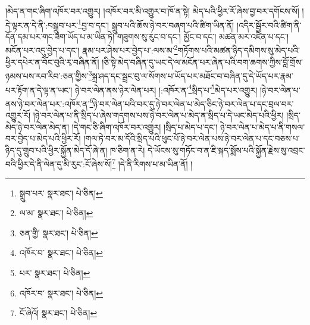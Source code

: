 །མེད་ན་གང་ཞིག་འཁོར་བར་འགྱུར། །འཁོར་བར་མི་འགྱུར་བ་ཁོ་ན་སྟེ། མེད་པའི་ཕྱིར་རོ་ཞེས་བྱ་བར་དགོངས་སོ། །དེ་ལྟར་ན་དེ་ནི་:བསྒྲུབ་པར་\footnote{སྒྲུབ་པར་  སྣར་ཐང་།  པེ་ཅིན། }བྱ་བ་དང་། སྒྲུབ་པའི་ཆོས་ཉེ་བར་བཞག་པའི་ཚིག་ཡིན་ནོ། །འདིར་སྦྱོར་བའི་ཚིག་ནི་དོན་དམ་པར་གང་ཟག་ཡོད་པ་མ་ཡིན་ཏེ། གཟུགས་སུ་རུང་བ་དང་། མྱོང་བ་དང་། མཚན་མར་འཛིན་པ་དང་། མངོན་པར་འདུ་བྱེད་པ་དང་། རྣམ་པར་ཤེས་པར་བྱེད་པ་:ལས་མ་\footnote{ལ་མ་  སྣར་ཐང་།  པེ་ཅིན། }གཏོགས་པའི་མཚན་ཉིད་དམིགས་སུ་མེད་པའི་ཕྱིར་དཔེར་ན་བོང་བུའི་རྭ་བཞིན་ནོ། །ཅི་སྟེ་མེད་བཞིན་དུ་ཡང་དེ་ལ་མངོན་པར་ཞེན་པའི་བག་ཆགས་ཀྱིས་བློ་གྲོས་ཉམས་པས་རབ་རིབ་:ཅན་གྱིས་\footnote{ཅན་གྱི་  སྣར་ཐང་།  པེ་ཅིན། }སྐྲ་ཤད་དང་སྦྲང་བུ་ལ་སོགས་པ་ཡོད་པར་མཐོང་བ་བཞིན་དུ་དེ་ཡོད་པར་རྣམ་པར་རྟོག་ན་དེ་ལྟ་ན་ཡང་། ཉེ་བར་ལེན་ནས་ཉེར་ལེན་པར། །:འཁོར་ན་\footnote{འཁོར་བ་  སྣར་ཐང་།  པེ་ཅིན། }སྲིད་པ་\footnote{པར་  སྣར་ཐང་།  པེ་ཅིན། }མེད་པར་འགྱུར། །ཉེ་བར་ལེན་པ་ནས་ཉེ་བར་ལེན་པར་:འཁོར་ན་\footnote{འཁོར་བ་  སྣར་ཐང་།  པེ་ཅིན། }ཉེ་བར་ལེན་པའི་བར་དུ་ཉེ་བར་ལེན་པ་མེད་ཅིང་ཉེ་བར་ལེན་པ་དང་བྲལ་བར་འགྱུར་རོ། །ཉེ་བར་ལེན་པ་ནི་སྲིད་པ་ཞེས་གདགས་པས་ཉེ་བར་ལེན་པ་མེད་ན་སྲིད་པ་དེ་ཡང་མེད་པའི་ཕྱིར། །སྲིད་མེད་ཉེ་བར་ལེན་མེད་ན། །དེ་གང་ཅི་ཞིག་འཁོར་བར་འགྱུར། །སྲིད་པ་མེད་པ་དང་། ཉེ་བར་ལེན་པ་མེད་པ་ནི་གསལ་བར་བྱེད་པ་མེད་པའི་ཕྱིར་རོ། །གལ་ཏེ་བར་མ་དོའི་སྲིད་པའི་ཕུང་པོ་ཉེ་བར་ལེན་པས་ཉེ་བར་ལེན་པ་དང་བཅས་པ་ཉིད་དུ་གྲུབ་པའི་ཕྱིར་སྐྱོན་མེད་དོ་ཞེ་ན། ཁ་ཅིག་ན་རེ། དེ་ཡོངས་སུ་གཏོང་བ་ན་ཇི་སྐད་སྨོས་པའི་སྐྱོན་རྗེས་སུ་འབྲང་བའི་ཕྱིར་དེ་ནི་ལེན་དུ་མི་རུང་:ངོ་ཞེས་སོ།\footnote{ངོ་ཞེའོ།  སྣར་ཐང་།  པེ་ཅིན། } །དེ་ནི་རིགས་པ་མ་ཡིན་ནོ། །
